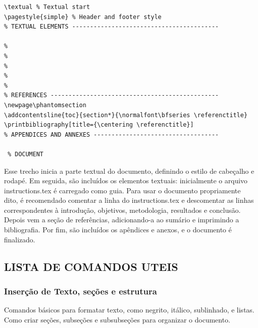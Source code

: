\begin{lstlisting}[firstnumber=last]
% TEXTUAL SPACE --------------------------------------------
\textual % Textual start 
\pagestyle{simple} % Header and footer style
% TEXTUAL ELEMENTS -----------------------------------------

%         
%  
%           
%
%            
% REFERENCES -----------------------------------------------
\newpage\phantomsection
\addcontentsline{toc}{section*}{\normalfont\bfseries \referenctitle}
\printbibliography[title={\centering \referenctitle}]
% APPENDICES AND ANNEXES -----------------------------------
              
 % DOCUMENT 
\end{lstlisting}

Esse trecho inicia a parte textual do documento, definindo o estilo de cabeçalho e rodapé. Em seguida, são incluídos os elementos textuais: inicialmente o arquivo instructions.tex é carregado como guia. Para usar o documento propriamente dito, é recomendado comentar a linha do instructions.tex e descomentar as linhas correspondentes à introdução, objetivos, metodologia, resultados e conclusão. Depois vem a seção de referências, adicionando-a ao sumário e imprimindo a bibliografia. Por fim, são incluídos os apêndices e anexos, e o documento é finalizado.

\subsection{LISTA DE COMANDOS UTEIS}


\subsubsection{Inserção de Texto, seções e estrutura}
Comandos básicos para formatar texto, como negrito, itálico, sublinhado, e listas. Como criar seções, subseções e subsubseções para organizar o documento.

